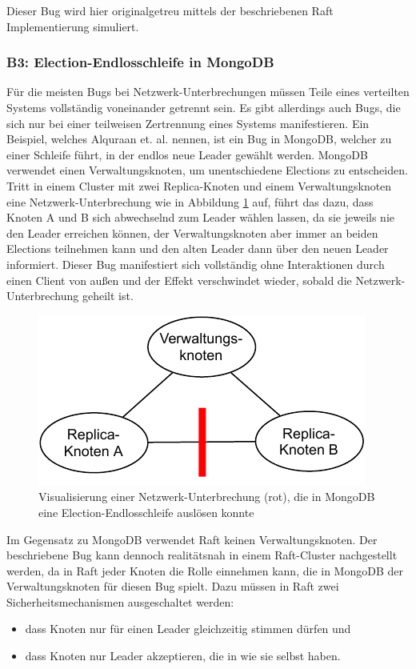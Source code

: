 \documentclass[12pt,a4paper]{report}
\begin{document}
Dieser Bug wird hier originalgetreu mittels der beschriebenen Raft Implementierung simuliert.

\subsubsection{B3: Election-Endlosschleife in MongoDB}
Für die meisten Bugs bei Netzwerk-Unterbrechungen müssen Teile eines verteilten Systems vollständig voneinander getrennt sein. Es
gibt allerdings auch Bugs, die sich nur bei einer teilweisen Zertrennung eines Systems manifestieren. Ein Beispiel, welches
Alquraan et. al. \cite{analysis_of_network_partition_failures} nennen, ist ein Bug in MongoDB, welcher zu einer Schleife führt, in
der endlos neue Leader gewählt werden. MongoDB verwendet einen Verwaltungsknoten, um unentschiedene Elections zu entscheiden.
Tritt in einem Cluster mit zwei Replica-Knoten und einem Verwaltungsknoten eine Netzwerk-Unterbrechung wie in Abbildung
\ref{fig:partial_partition_mongo} auf, führt das dazu, dass Knoten A und B sich abwechselnd zum Leader wählen lassen, da sie jeweils nie
den Leader erreichen können, der Verwaltungsknoten aber immer an beiden Elections teilnehmen kann und den alten Leader dann über
den neuen Leader informiert. Dieser Bug manifestiert sich vollständig ohne Interaktionen durch einen Client von außen und
der Effekt verschwindet wieder, sobald die Netzwerk-Unterbrechung geheilt ist.

\begin{figure}[H]
	\centering
	\includegraphics[width=0.6\linewidth]{img/ditm-Partitions.pdf}
	\caption{Visualisierung einer Netzwerk-Unterbrechung (rot), die in MongoDB eine Election-Endlosschleife auslösen konnte}
	\label{fig:partial_partition_mongo}
\end{figure}

Im Gegensatz zu MongoDB verwendet Raft keinen Verwaltungsknoten. Der beschriebene Bug kann dennoch realitätsnah in einem
Raft-Cluster nachgestellt werden, da in Raft jeder Knoten die Rolle einnehmen kann, die in MongoDB der Verwaltungsknoten für diesen
Bug spielt. Dazu müssen in Raft zwei Sicherheitsmechanismen ausgeschaltet werden:
\begin{itemize}
	\item dass Knoten nur für einen Leader gleichzeitig stimmen dürfen und
	\item dass Knoten nur Leader akzeptieren,  die in  wie sie selbst haben.
\end{itemize}
\end{document}
